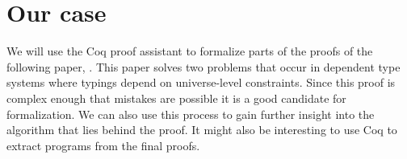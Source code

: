 \chapter{Our case}

We will use the Coq proof assistant to formalize parts of the proofs of the following paper, \citeauthor{mbezem} \cite{mbezem}.
This paper solves two problems that occur in dependent type systems where typings depend
on universe-level constraints. Since this proof is complex enough that mistakes are possible
it is a good candidate for formalization. We can also use this process to gain further insight
into the algorithm that lies behind the proof. It might also be interesting to use Coq to
extract programs from the final proofs.
